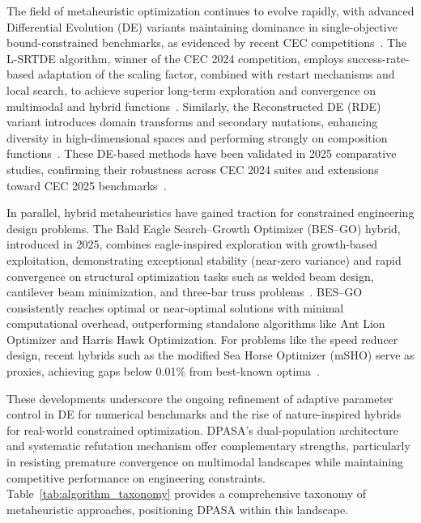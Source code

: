 \documentclass[11pt]{article}
\begin{document}
The field of metaheuristic optimization continues to evolve rapidly, with advanced Differential Evolution (DE) variants maintaining dominance in single-objective bound-constrained benchmarks, as evidenced by recent CEC competitions~\citep{stanovov2024lsrtde,tao2024rde}. The L-SRTDE algorithm, winner of the CEC 2024 competition, employs success-rate-based adaptation of the scaling factor, combined with restart mechanisms and local search, to achieve superior long-term exploration and convergence on multimodal and hybrid functions~\citep{stanovov2024lsrtde}. Similarly, the Reconstructed DE (RDE) variant introduces domain transforms and secondary mutations, enhancing diversity in high-dimensional spaces and performing strongly on composition functions~\citep{tao2024rde}. These DE-based methods have been validated in 2025 comparative studies, confirming their robustness across CEC 2024 suites and extensions toward CEC 2025 benchmarks~\citep{stanovov2025comparative}.

In parallel, hybrid metaheuristics have gained traction for constrained engineering design problems. The Bald Eagle Search--Growth Optimizer (BES--GO) hybrid, introduced in 2025, combines eagle-inspired exploration with growth-based exploitation, demonstrating exceptional stability (near-zero variance) and rapid convergence on structural optimization tasks such as welded beam design, cantilever beam minimization, and three-bar truss problems~\citep{houssein2025besgo}. BES--GO consistently reaches optimal or near-optimal solutions with minimal computational overhead, outperforming standalone algorithms like Ant Lion Optimizer and Harris Hawk Optimization. For problems like the speed reducer design, recent hybrids such as the modified Sea Horse Optimizer (mSHO) serve as proxies, achieving gaps below 0.01\% from best-known optima~\citep{hashim2024msho}.

These developments underscore the ongoing refinement of adaptive parameter control in DE for numerical benchmarks and the rise of nature-inspired hybrids for real-world constrained optimization. DPASA's dual-population architecture and systematic refutation mechanism offer complementary strengths, particularly in resisting premature convergence on multimodal landscapes while maintaining competitive performance on engineering constraints.
Table~\ref{tab:algorithm_taxonomy} provides a comprehensive taxonomy of metaheuristic approaches, positioning DPASA within this landscape.
\end{document}
